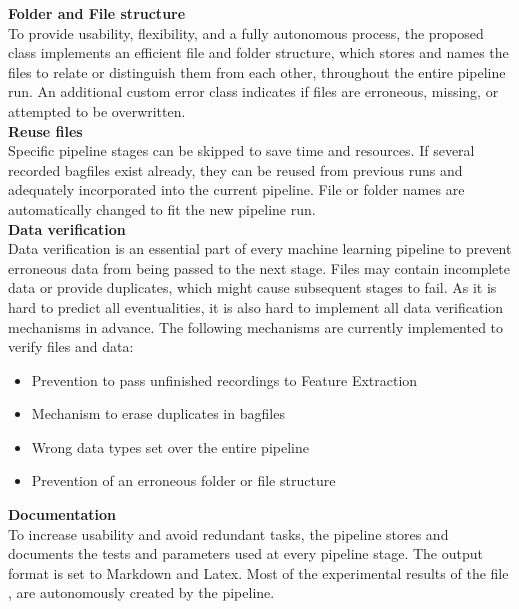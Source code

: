 \textbf{Folder and File structure}\\
To provide usability, flexibility, and a fully autonomous process, the proposed class implements an efficient file and folder structure, which stores and names the files to relate or distinguish them from each other, throughout the entire pipeline run. An additional custom error class indicates if files are erroneous, missing, or attempted to be overwritten.\\

\textbf{Reuse files}\\
Specific pipeline stages can be skipped to save time and resources. If several recorded bagfiles exist already, they can be reused from previous runs and adequately incorporated into the current pipeline. File or folder names are automatically changed to fit the new pipeline run.\\

\textbf{Data verification}\\
Data verification is an essential part of every machine learning pipeline to prevent erroneous data from being passed to the next stage. Files may contain incomplete data or provide duplicates, which might cause subsequent stages to fail. As it is hard to predict all eventualities, it is also hard to implement all data verification mechanisms in advance. The following mechanisms are currently implemented to verify files and data:

\begin{itemize}
\item Prevention to pass unfinished recordings to Feature Extraction
\item Mechanism to erase duplicates in bagfiles
\item Wrong data types set over the entire pipeline
\item Prevention of an erroneous folder or file structure
\end{itemize}

\textbf{Documentation}\\
To increase usability and avoid redundant tasks, the pipeline stores and documents the tests and parameters used at every pipeline stage. The output format is set to Markdown and Latex. Most of the experimental results of the file , are autonomously created by the pipeline.

\newpage
